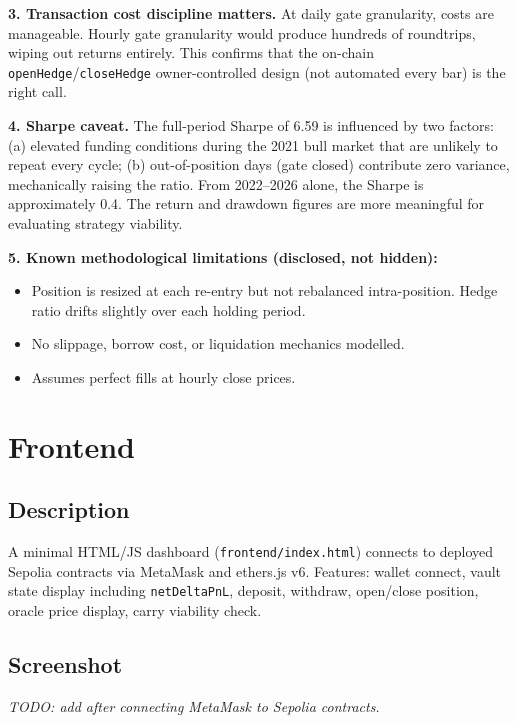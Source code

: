\documentclass[11pt,a4paper]{article}
\begin{document}
\textbf{3. Transaction cost discipline matters.} At daily gate granularity, costs are manageable. Hourly gate granularity would produce hundreds of roundtrips, wiping out returns entirely. This confirms that the on-chain \texttt{openHedge}/\texttt{closeHedge} owner-controlled design (not automated every bar) is the right call.

\textbf{4. Sharpe caveat.} The full-period Sharpe of 6.59 is influenced by two factors: (a) elevated funding conditions during the 2021 bull market that are unlikely to repeat every cycle; (b) out-of-position days (gate closed) contribute zero variance, mechanically raising the ratio. From 2022--2026 alone, the Sharpe is approximately 0.4. The return and drawdown figures are more meaningful for evaluating strategy viability.

\textbf{5. Known methodological limitations (disclosed, not hidden):}
\begin{itemize}
    \item Position is resized at each re-entry but not rebalanced intra-position. Hedge ratio drifts slightly over each holding period.
    \item No slippage, borrow cost, or liquidation mechanics modelled.
    \item Assumes perfect fills at hourly close prices.
\end{itemize}

\section{Frontend}

\subsection{Description}

A minimal HTML/JS dashboard (\texttt{frontend/index.html}) connects to deployed Sepolia contracts via MetaMask and ethers.js v6. Features: wallet connect, vault state display including \texttt{netDeltaPnL}, deposit, withdraw, open/close position, oracle price display, carry viability check.

\subsection{Screenshot}

\textit{TODO: add after connecting MetaMask to Sepolia contracts.}
\end{document}
